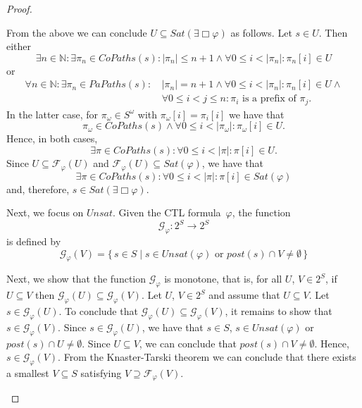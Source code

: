 \documentclass[12pt]{article}
\newcommand{\always}{\Box}
\theoremstyle{definition}
\newenvironment{franck}{\color{red}}{\color{black}}
\begin{document}
\begin{proof}
\begin{itemize}
\begin{franck}
\begin{itemize}
\begin{itemize}
\begin{itemize}
\begin{itemize}
\end{itemize}
\end{itemize}
\end{itemize}
From the above we can conclude $U \subseteq \mathit{Sat}(\exists \always \varphi)$ as follows.  Let $s \in U$.  Then either
\[
\exists n \in \mathbb{N} : \exists \pi_n \in \mathit{CoPaths}(s) : |\pi_n| \leq n + 1 \wedge\forall 0 \leq i < |\pi_n| : \pi_n[i] \in U
\]
or
\begin{align*}
\forall n \in \mathbb{N} : \exists \pi_n \in \mathit{PaPaths}(s) :\, & |\pi_n| = n + 1 \wedge \forall 0 \leq i < |\pi_n| : \pi_n[i] \in U \wedge\\
& \forall 0 \leq i < j \leq n: \pi_i \mbox{ is a prefix of } \pi_j.
\end{align*}
In the latter case, for $\pi_{\omega} \in S^{\omega}$ with $\pi_{\omega}[i] = \pi_i[i]$ we have that 
\[
\pi_{\omega} \in \mathit{CoPaths}(s) \wedge \forall 0 \leq i < |\pi_{\omega}| : \pi_{\omega}[i] \in U.
\]
Hence, in both cases,
\[
\exists \pi \in \mathit{CoPaths}(s) : \forall 0 \leq i < |\pi| : \pi[i] \in U.
\]
Since $U \subseteq \mathcal{F}_{\varphi}(U)$ and $\mathcal{F}_{\varphi}(U) \subseteq \mathit{Sat}(\varphi)$, we have that 
\[
\exists \pi \in \mathit{CoPaths}(s) : \forall 0 \leq i < |\pi| : \pi[i] \in \mathit{Sat}(\varphi)
\]
and, therefore, $s \in \mathit{Sat}(\exists \always \varphi)$.

Next, we focus on $\mathit{Unsat}$.  Given the CTL formula~$\varphi$, the function
\[
\mathcal{G}_{\varphi} : 2^S \to 2^S
\]
is defined by
\[
\mathcal{G}_{\varphi}(V) = 
\{\, s \in S \mid s \in \mathit{Unsat}(\varphi) \mbox{ or } \mathit{post}(s) \cap V \not= \emptyset \,\} 
\]

Next, we show that the function $\mathcal{G}_{\varphi}$ is monotone, that is, for all $U$, $V \in 2^S$, if $U \subseteq V$ then $\mathcal{G}_{\varphi}(U) \subseteq \mathcal{G}_{\varphi}(V)$.  Let $U$, $V \in 2^S$ and assume that $U \subseteq V$.  Let $s \in \mathcal{G}_{\varphi}(U)$. To conclude that $\mathcal{G}_{\varphi}(U) \subseteq \mathcal{G}_{\varphi}(V)$, it remains to show that $s \in \mathcal{G}_{\varphi}(V)$.  Since $s \in \mathcal{G}_{\varphi}(U)$, we have that $s \in S$, $s \in \mathit{Unsat}(\varphi)$ or $\mathit{post}(s) \cap U \not= \emptyset$.  Since $U \subseteq V$, we can conclude that $\mathit{post}(s) \cap V \not= \emptyset$.  Hence, $s \in \mathcal{G}_{\varphi}(V)$.  From the Knaster-Tarski theorem we can conclude that there exists a smallest $V \subseteq S$ satisfying $V \supseteq \mathcal{F}_{\varphi}(V)$.





\end{itemize}
\end{franck}
\end{itemize}
\end{proof}
\end{document}
